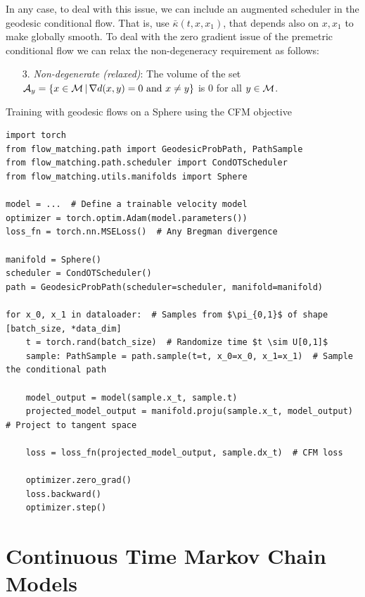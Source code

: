 \documentclass{fairmeta}
\renewcommand{\eqref}[1]{\labelcref{#1}}
\numberwithin{equation}{section}
\begin{document}
In any case, to deal with this issue, we can include an augmented scheduler in the geodesic conditional flow. That is, use  $\bar{\kappa}(t,x,x_1)$, that depends also on $x,x_1$ to make \eqref{e:exp_log} globally smooth. To deal with the zero gradient issue of the premetric conditional flow we can relax the non-degeneracy requirement as follows:
\begin{itemize}
    \item[3.]  \emph{Non-degenerate (relaxed)}: The volume of the set ${\mathcal{A}}_y = \left\{x\in {\mathcal{M}} \, \vert \,  \nabla d(x,y)=0 \text{ and } x\ne y \right\} $ is $0$ for all $y\in {\mathcal{M}}$.
\end{itemize}





\begin{pbox}[label={ex:fm_riemannian}]{Training with geodesic flows on a Sphere using the CFM objective}
\begin{verbatim}
import torch
from flow_matching.path import GeodesicProbPath, PathSample
from flow_matching.path.scheduler import CondOTScheduler
from flow_matching.utils.manifolds import Sphere

model = ...  # Define a trainable velocity model
optimizer = torch.optim.Adam(model.parameters())
loss_fn = torch.nn.MSELoss()  # Any Bregman divergence

manifold = Sphere()
scheduler = CondOTScheduler()
path = GeodesicProbPath(scheduler=scheduler, manifold=manifold)  

for x_0, x_1 in dataloader:  # Samples from $\pi_{0,1}$ of shape [batch_size, *data_dim]
    t = torch.rand(batch_size)  # Randomize time $t \sim U[0,1]$
    sample: PathSample = path.sample(t=t, x_0=x_0, x_1=x_1)  # Sample the conditional path
    
    model_output = model(sample.x_t, sample.t)
    projected_model_output = manifold.proju(sample.x_t, model_output)  # Project to tangent space
    
    loss = loss_fn(projected_model_output, sample.dx_t)  # CFM loss
    
    optimizer.zero_grad()  
    loss.backward()
    optimizer.step()
\end{verbatim}
\end{pbox}


\pagebreak
\section{Continuous Time Markov Chain Models}\label{sec:ctmcm}
\end{document}

